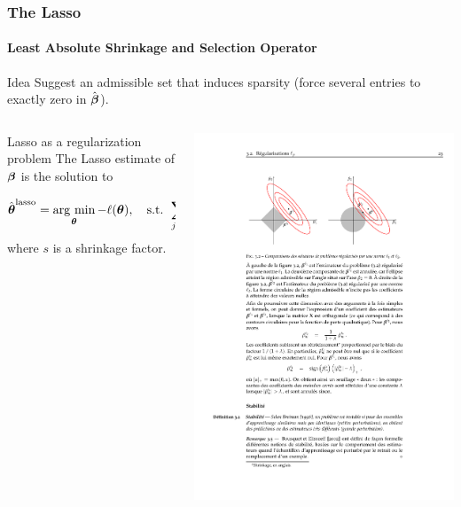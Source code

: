 \begin{frame}
  \frametitle{The Lasso}
  \framesubtitle{Least Absolute Shrinkage and Selection Operator}

  \begin{block}{Idea}
    Suggest  an admissible  set that  induces  \alert{sparsity} (force
    several entries to exactly zero in $\hat{\boldsymbol\beta}$).
  \end{block}

  \vfill

  \begin{overlayarea}{\textwidth}{.4\textheight}
    \begin{columns}
      \begin{column}[c]{.6\textwidth}
        \begin{block}{Lasso as a regularization problem}
          The Lasso estimate of $\boldsymbol\beta$ is the solution to
          \begin{equation*}
            \hat{\boldsymbol\theta}^{\text{lasso}}     =    \mathop{\mathrm{arg\ min}}_{\boldsymbol\theta}
            -\ell(\boldsymbol\theta),  \quad   \text{s.t.  }  \sum_{j=1}^p
            \left|\theta_j\right|
            \leq s,
          \end{equation*}
          where $s$ is a shrinkage factor.
        \end{block}
      \end{column}
      \begin{column}{.3\textwidth}
        \includegraphics[width=\textwidth]{figures/lasso_set}

\end{column}
\end{columns}
\end{overlayarea}
\end{frame}
